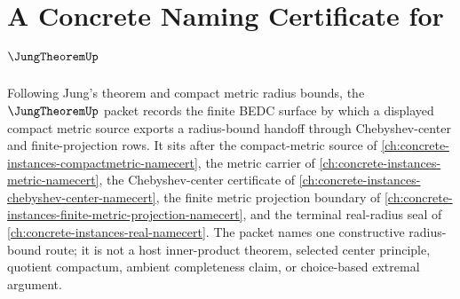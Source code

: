 \chapter{A Concrete Naming Certificate for $\JungTheoremUp$}
\label{ch:concrete-instances-jung-theorem-namecert}

Following Jung's theorem and compact metric radius bounds, the $\JungTheoremUp$ packet records the finite BEDC surface by which a displayed compact metric source exports a radius-bound handoff through Chebyshev-center and finite-projection rows. It sits after the compact-metric source of \autoref{ch:concrete-instances-compactmetric-namecert}, the metric carrier of \autoref{ch:concrete-instances-metric-namecert}, the Chebyshev-center certificate of \autoref{ch:concrete-instances-chebyshev-center-namecert}, the finite metric projection boundary of \autoref{ch:concrete-instances-finite-metric-projection-namecert}, and the terminal real-radius seal of \autoref{ch:concrete-instances-real-namecert}. The packet names one constructive radius-bound route; it is not a host inner-product theorem, selected center principle, quotient compactum, ambient completeness claim, or choice-based extremal argument.

